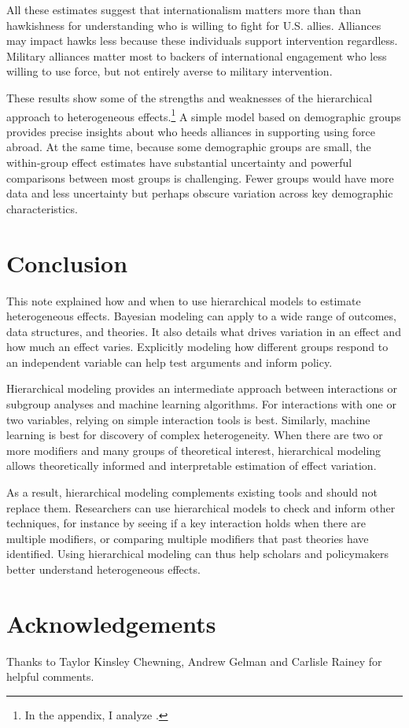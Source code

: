 \documentclass[12pt]{article}
\begin{document}
All these estimates suggest that internationalism matters more than than hawkishness for understanding who is willing to fight for U.S. allies. 
Alliances may impact hawks less because these individuals support intervention regardless. 
Military alliances matter most to backers of international engagement who less willing to use force, but not entirely averse to military intervention.


These results show some of the strengths and weaknesses of the hierarchical approach to heterogeneous effects.\footnote{In the appendix, I analyze \citet{BushPrather2020}.}
A simple model based on demographic groups provides precise insights about who heeds alliances in supporting using force abroad. 
At the same time, because some demographic groups are small, the within-group effect estimates have substantial uncertainty and powerful comparisons between most groups is challenging. 
Fewer groups would have more data and less uncertainty but perhaps obscure variation across key demographic characteristics. 


\section{Conclusion}


This note explained how and when to use hierarchical models to estimate heterogeneous effects. 
Bayesian modeling can apply to a wide range of outcomes, data structures, and theories. 
It also details what drives variation in an effect and how much an effect varies. 
Explicitly modeling how different groups respond to an independent variable can help test arguments and inform policy.  


Hierarchical modeling provides an intermediate approach between interactions or subgroup analyses and machine learning algorithms. 
For interactions with one or two variables, relying on simple interaction tools is best. 
Similarly, machine learning is best for discovery of complex heterogeneity.
When there are two or more modifiers and many groups of theoretical interest, hierarchical modeling allows theoretically informed and interpretable estimation of effect variation. 

As a result, hierarchical modeling complements existing tools and should not replace them. 
Researchers can use hierarchical models to check and inform other techniques, for instance by seeing if a key interaction holds when there are multiple modifiers, or comparing multiple modifiers that past theories have identified. 
Using hierarchical modeling can thus help scholars and policymakers better understand heterogeneous effects.


\section*{Acknowledgements}

Thanks to Taylor Kinsley Chewning, Andrew Gelman and Carlisle Rainey for helpful comments.

\singlespace
 


%
\end{document}
